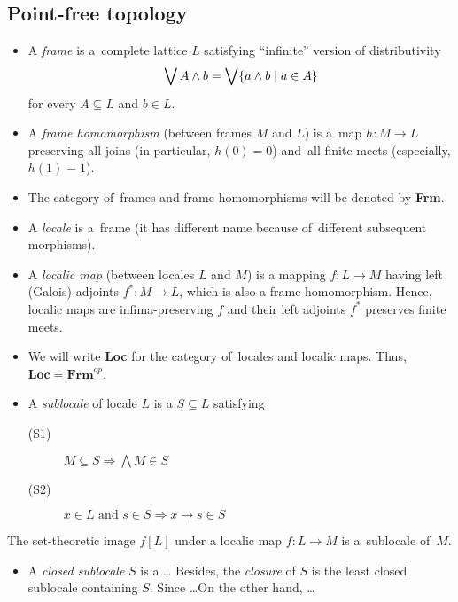 \subsection*{Point-free topology}

\begin{itemize}
\item A \emph{frame} is a~complete lattice $L$ satisfying ``infinite'' version
of distributivity
\[
  \bigvee A \wedge b = \bigvee \{ a \wedge b \mid a\in A \}
\]
for every $A\subseteq L$ and $b\in L$.

\item A \emph{frame homomorphism} (between frames $M$ and $L$) is a~map
$h\colon M \to L$ preserving all joins (in particular, $h(0) = 0$) and~all
finite meets (especially, $h(1) = 1$).

\item The category of~frames and frame homomorphisms will be denoted by {\bf
Frm}.

\item A \emph{locale} is a~frame (it has different name because of~different
subsequent morphisms).

\item A \emph{localic map} (between locales $L$ and $M$) is a mapping $f\colon
L \to M$ having left (Galois) adjoints $f^*\colon M \to L$, which is also a
frame homomorphism.
Hence, localic maps are infima-preserving $f$ and their left adjoints $f^*$
preserves finite meets.

\item We will write {\bf Loc} for the category of~locales and localic maps.
Thus, $\mathbf{Loc} = \mathbf{Frm}^{op}$.

\item A \emph{sublocale} of locale $L$ is a $S\subseteq L$ satisfying
  \begin{description}
  \item[(S1)] $M\subseteq S \Longrightarrow \bigwedge M\in S$
  \item[(S2)] $x\in L \text{ and } s\in S \Longrightarrow x \rightarrow s \in S$ 
  \end{description}
\end{itemize}

\begin{fact}
  The set-theoretic image $f[L]$ under a localic map $f\colon L\to M$
  is a~sublocale of~$M$.
\end{fact}

\begin{itemize}
\item A \emph{closed sublocale} $S$ is a \ldots
Besides, the \emph{closure} of $S$ is the least closed sublocale containing $S$.
Since \ldots On the other hand, \ldots
\end{itemize}

